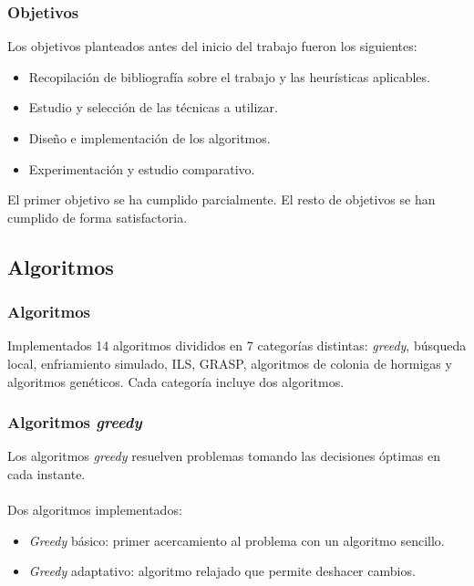 \documentclass{beamer}
\begin{document}

\begin{frame}
  \frametitle{Objetivos}
  Los objetivos planteados antes del inicio del trabajo fueron los siguientes:
  \begin{itemize}
    \item Recopilación de bibliografía sobre el trabajo y las heurísticas aplicables.
    \item Estudio y selección de las técnicas a utilizar.
    \item Diseño e implementación de los algoritmos.
    \item Experimentación y estudio comparativo.
  \end{itemize}
  El primer objetivo se ha cumplido parcialmente. El resto de objetivos se han cumplido de forma satisfactoria.

\end{frame}


\subsection{Algoritmos}

\begin{frame}
  \frametitle{Algoritmos}
  Implementados 14 algoritmos divididos en 7 categorías distintas: \textit{greedy}, búsqueda local,
  enfriamiento simulado, ILS, GRASP, algoritmos de colonia de hormigas y algoritmos genéticos.
  Cada categoría incluye dos algoritmos.

\end{frame}

\begin{frame}
  \frametitle{Algoritmos \textit{greedy}}
  Los algoritmos \textit{greedy} resuelven problemas tomando las decisiones óptimas en cada instante. \\~\\

  Dos algoritmos implementados:
  \begin{itemize}
    \item \textit{Greedy} básico: primer acercamiento al problema con un algoritmo sencillo.
    \item \textit{Greedy} adaptativo: algoritmo relajado que permite deshacer cambios. \cite{grosso:2004}
  \end{itemize}

\end{frame}
\end{document}
